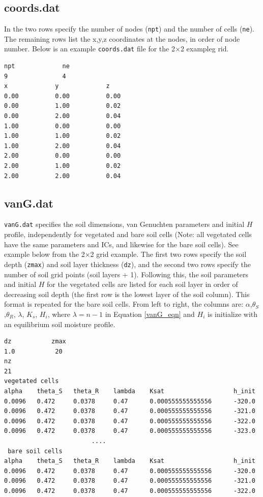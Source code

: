 \documentclass{article}
\newcommand{\code}[1]{\texttt{#1}}
\begin{document}
\subsection{coords.dat}

In the two rows specify the number of nodes (\code{npt}) and the number of cells (\code{ne}).  The remaining rows list the x,y,z coordinates at the nodes, in order of node number. Below is an example \code{coords.dat} file for the 2$\times$2 exampleg rid.


\begin{verbatim}
npt             ne           
9               4            
x             y             z              
0.00          0.00          0.00           
0.00          1.00          0.02           
0.00          2.00          0.04           
1.00          0.00          0.00           
1.00          1.00          0.02           
1.00          2.00          0.04           
2.00          0.00          0.00           
2.00          1.00          0.02           
2.00          2.00          0.04           
\end{verbatim}

\subsection{vanG.dat}

\code{vanG.dat} specifies the soil dimensions, van Genuchten parameters and initial $H$ profile, independently for vegetated and bare soil cells (Note: all vegetated cells have the same parameters and ICs, and likewise for the bare soil cells).   See example below from the 2$\times$2 grid example.
The first two rows specify the soil depth (\code{zmax}) and soil layer thickness (\code{dz}), and the second two rows specify the number of soil grid points (soil layers + 1).   
Following this, the soil parameters and initial $H$ for the vegetated cells are listed for each soil layer in order of decreasing soil depth (the first row is the lowest layer of the soil column).   This format is repeated for the bare soil cells.   
From left to right, the columns are: 
	$\alpha$,$\theta_S$,$\theta_R$, $\lambda$, $K_s$, $H_i$, where $\lambda =  n-1 $ in Equation \ref{vanG_eqn} and $H_i$ is initialize with an equilibrium soil moisture profile.
	
\begin{verbatim}
dz           zmax 
1.0           20             
nz 
21             
vegetated cells  
alpha    theta_S   theta_R    lambda    Ksat                   h_init 
0.0096   0.472     0.0378     0.47      0.000555555555556      -320.0 
0.0096   0.472     0.0378     0.47      0.000555555555556      -321.0 
0.0096   0.472     0.0378     0.47      0.000555555555556      -322.0 
0.0096   0.472     0.0378     0.47      0.000555555555556      -323.0 
						....
 bare soil cells 
alpha    theta_S   theta_R    lambda    Ksat                   h_init 
0.0096   0.472     0.0378     0.47      0.000555555555556      -320.0 
0.0096   0.472     0.0378     0.47      0.000555555555556      -321.0 
0.0096   0.472     0.0378     0.47      0.000555555555556      -322.0 
\end{verbatim}
\end{document}
